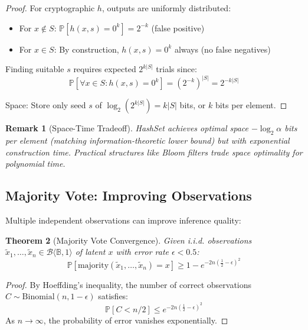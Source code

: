 \documentclass[11pt,final,hidelinks]{article}
\newtheorem{theorem}{Theorem}[section]
\newtheorem{remark}[theorem]{Remark}
\newcommand{\bernoulli}[2]{\mathcal{B}\langle #1, #2 \rangle}
\newcommand{\Bool}{\mathbb{B}}
\newcommand{\Prob}[1]{\mathbb{P}\left[#1\right]}
\begin{document}
\begin{proof}
For cryptographic $h$, outputs are uniformly distributed:
\begin{itemize}
    \item For $x \notin S$: $\Prob{h(x, s) = 0^k} = 2^{-k}$ (false positive)
    \item For $x \in S$: By construction, $h(x, s) = 0^k$ always (no false negatives)
\end{itemize}

Finding suitable $s$ requires expected $2^{k|S|}$ trials since:
\begin{equation}
\Prob{\forall x \in S: h(x, s) = 0^k} = (2^{-k})^{|S|} = 2^{-k|S|}
\end{equation}

Space: Store only seed $s$ of $\log_2(2^{k|S|}) = k|S|$ bits, or $k$ bits per element.
\end{proof}

\begin{remark}[Space-Time Tradeoff]
HashSet achieves optimal space $-\log_2 \alpha$ bits per element (matching information-theoretic lower bound) but with exponential construction time. Practical structures like Bloom filters trade space optimality for polynomial time.
\end{remark}

\subsection{Majority Vote: Improving Observations}

Multiple independent observations can improve inference quality:

\begin{theorem}[Majority Vote Convergence]
Given i.i.d. observations $\tilde{x}_1, \ldots, \tilde{x}_n \in \bernoulli{\Bool}{1}$ of latent $x$ with error rate $\epsilon < 0.5$:
\begin{equation}
\Prob{\text{majority}(\tilde{x}_1, \ldots, \tilde{x}_n) = x} \geq 1 - e^{-2n(\frac{1}{2} - \epsilon)^2}
\end{equation}
\end{theorem}

\begin{proof}
By Hoeffding's inequality, the number of correct observations $C \sim \text{Binomial}(n, 1-\epsilon)$ satisfies:
\begin{equation}
\Prob{C < n/2} \leq e^{-2n(\frac{1}{2} - \epsilon)^2}
\end{equation}
As $n \to \infty$, the probability of error vanishes exponentially.
\end{proof}
\end{document}
